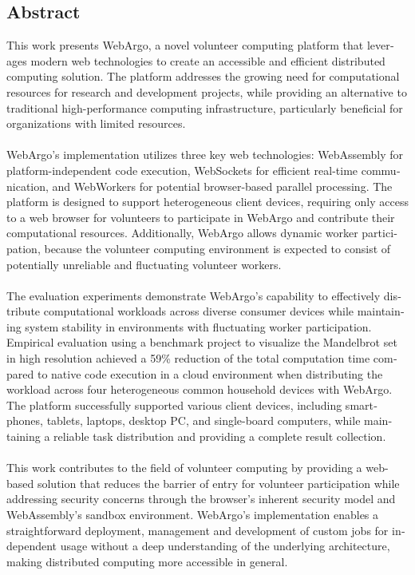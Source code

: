 \begin{otherlanguage}{american}
	\chapter*{Abstract}
	\begin{sloppypar}
		This work presents WebArgo, a novel volunteer computing platform that leverages modern web technologies to create an accessible and efficient distributed computing solution. The platform addresses the growing need for computational resources for research and development projects, while providing an alternative to traditional high-performance computing infrastructure, particularly beneficial for organizations with limited resources.
		\\~\\
		WebArgo's implementation utilizes three key web technologies: WebAssembly for platform-independent code execution, WebSockets for efficient real-time communication, and WebWorkers for potential browser-based parallel processing. The platform is designed to support heterogeneous client devices, requiring only access to a web browser for volunteers to participate in WebArgo and contribute their computational resources. Additionally, WebArgo allows dynamic worker participation, because the volunteer computing environment is expected to consist of potentially unreliable and fluctuating volunteer workers.
		\\~\\
		The evaluation experiments demonstrate WebArgo's capability to effectively distribute computational workloads across diverse consumer devices while maintaining system stability in environments with fluctuating worker participation. Empirical evaluation using a benchmark project to visualize the Mandelbrot set in high resolution achieved a 59\% reduction of the total computation time compared to native code execution in a cloud environment when distributing the workload across four heterogeneous common household devices with WebArgo. The platform successfully supported various client devices, including smartphones, tablets, laptops, desktop \ac{PC}, and single-board computers, while maintaining a reliable task distribution and providing a complete result collection.
		\\~\\
		This work contributes to the field of volunteer computing by providing a web-based solution that reduces the barrier of entry for volunteer participation while addressing security concerns through the browser's inherent security model and WebAssembly's sandbox environment. WebArgo's implementation enables a straightforward deployment, management and development of custom jobs for independent usage without a deep understanding of the underlying architecture, making distributed computing more accessible in general.
	\end{sloppypar}
\end{otherlanguage}
